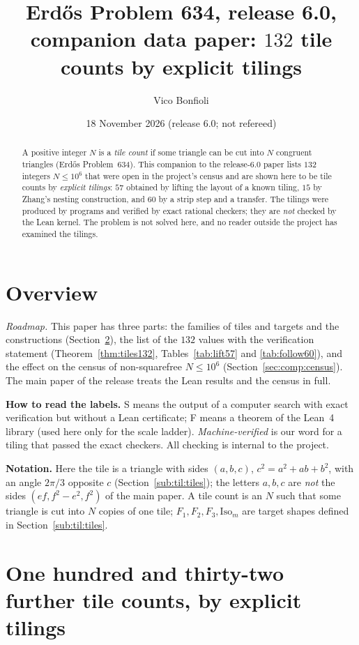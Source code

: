 \documentclass[11pt,reqno]{amsart}
\title[Companion data paper]{Erd\H{o}s Problem 634, release 6.0, companion data paper: $132$ tile counts by explicit tilings}
\author{Vico Bonfioli}
\date{18 November 2026 (release 6.0; not refereed)}
\theoremstyle{plain}
\theoremstyle{definition}
\newcommand{\sF}{\textup{\textsf{F}}}
\newcommand{\sS}{\textup{\textsf{S}}}
\begin{document}
\begin{abstract}
A positive integer $N$ is a \emph{tile count} if some triangle can be cut into $N$ congruent triangles (Erd\H{o}s Problem~634).
This companion to the release-6.0 paper lists $132$ integers $N\le10^6$ that were open in the project's census and are shown here
to be tile counts by \emph{explicit tilings}: $57$ obtained by lifting the layout of a known tiling, $15$ by Zhang's nesting
construction, and $60$ by a strip step and a transfer. The tilings were produced by programs and verified by exact rational
checkers; they are \emph{not} checked by the Lean kernel. The problem is not solved here, and no reader outside the project has examined the tilings.
\end{abstract}
\maketitle

\section{Overview}\label{sec:comp:overview}
\emph{Roadmap.} This paper has three parts: the families of tiles and targets and the constructions (Section~\ref{sec:tilings}), the list of
the $132$ values with the verification statement (Theorem~\ref{thm:tiles132}, Tables~\ref{tab:lift57} and \ref{tab:follow60}), and the effect on the census of
non-squarefree $N\le10^6$ (Section~\ref{sec:comp:census}). The main paper of the release treats the Lean results and the census in full.

\textbf{How to read the labels.} \sS{} means the output of a computer search with exact verification but without a Lean
certificate; \sF{} means a theorem of the Lean~4 library (used here only for the scale ladder). \emph{Machine-verified} is
our word for a tiling that passed the exact checkers. All checking is internal to the project.

\textbf{Notation.} Here the tile is a triangle with sides $(a,b,c)$, $c^2=a^2+ab+b^2$, with an angle $2\pi/3$ opposite $c$
(Section~\ref{sub:til:tiles}); the letters $a,b,c$ are \emph{not} the sides $(ef,f^2-e^2,f^2)$ of the main paper. A tile count is an
$N$ such that some triangle is cut into $N$ copies of one tile; $F_1,F_2,F_3,\mathrm{Iso}_m$ are target shapes defined in
Section~\ref{sub:til:tiles}.


\section{One hundred and thirty-two further tile counts, by explicit tilings}\label{sec:tilings}
\end{document}
